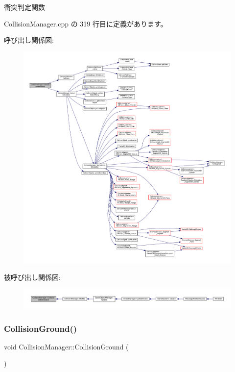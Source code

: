 衝突判定関数 



 Collision\+Manager.\+cpp の 319 行目に定義があります。

呼び出し関係図\+:\nopagebreak
\begin{figure}[H]
\begin{center}
\leavevmode
\includegraphics[width=350pt]{class_collision_manager_a67c1ebc4d4a19e06122f11c3eeec89ec_cgraph}
\end{center}
\end{figure}
被呼び出し関係図\+:
\nopagebreak
\begin{figure}[H]
\begin{center}
\leavevmode
\includegraphics[width=350pt]{class_collision_manager_a67c1ebc4d4a19e06122f11c3eeec89ec_icgraph}
\end{center}
\end{figure}
\mbox{\label{class_collision_manager_a1d67f4076eb71e191db5cff4e5abe3b0}} 
\subsubsection{\texorpdfstring{Collision\+Ground()}{CollisionGround()}}
{\footnotesize\ttfamily void Collision\+Manager\+::\+Collision\+Ground (\begin{DoxyParamCaption}{ }\end{DoxyParamCaption})\hspace{0.3cm}{\ttfamily [private]}}



